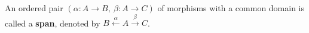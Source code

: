 \begin{definition}
    An ordered pair \( (\alpha : A \mathop{\to} B,~\beta : A \mathop{\to} C) \) of morphisms with a common domain is called a \textbf{span}, denoted by \( B \overset{\alpha}{\leftarrow} A \overset{\beta}{\rightarrow} C \).
\end{definition}